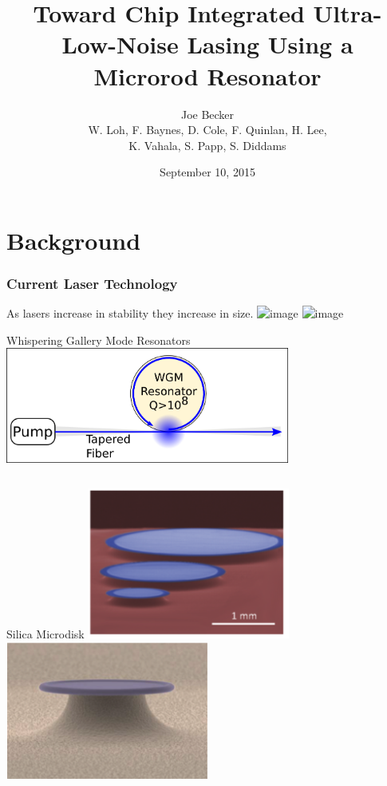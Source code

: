 \documentclass{beamer}
\title[Microrod Lasing]{Toward Chip Integrated Ultra-Low-Noise Lasing Using a Microrod Resonator} %
\author[J. Becker]{Joe Becker \\
\scriptsize{W. Loh, F. Baynes, D. Cole, F. Quinlan, H. Lee,\\
K. Vahala, S. Papp, S. Diddams}} %
\institute[NIST] %
{
National Institute of Standards and Technology\\ %
\medskip
\textit{Joe.Becker@nist.gov} %
}
\date{September 10, 2015} %
\begin{document}
\begin{frame}
\titlepage %
\end{frame}


\section{Background} 
\begin{frame}\frametitle{Current Laser Technology}
As lasers increase in stability they increase in size.
\includegraphics<1>[width=0.95\textwidth]{Images/Current_Laser1.png}
\includegraphics<2>[width=0.95\textwidth]{Images/Current_Laser2.png}
\end{frame}

\begin{frame}{Whispering Gallery Mode Resonators}
\centering
\includegraphics[width=0.7\textwidth]{Images/WGM_Resonator_Fig.png}
\begin{columns}

\begin{block}{Silica Microdisk}
\includegraphics[width=0.5\textwidth]{Images/Wedge_Microdisk.png}
\includegraphics[width=0.5\textwidth]{Images/Microtoroid.png}


\end{block}
\end{columns}
\end{frame}
\end{document}
